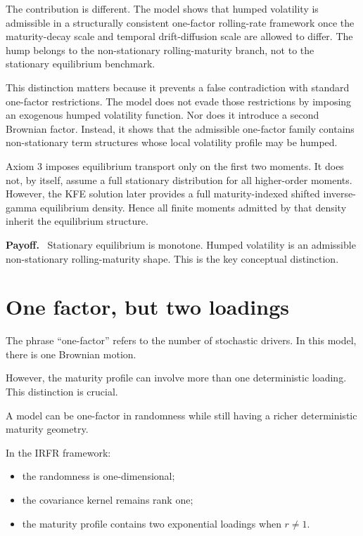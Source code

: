 \documentclass[11pt]{article}
\theoremstyle{plainbreak}
\newenvironment{takeaway}{%
    \vspace{0.4em}\noindent\textbf{Payoff.}\ }{\par\vspace{0.4em}}
\begin{document}
The contribution is different. The model shows that humped volatility is admissible in a structurally consistent one-factor rolling-rate framework once the maturity-decay scale and temporal drift-diffusion scale are allowed to differ. The hump belongs to the non-stationary rolling-maturity branch, not to the stationary equilibrium benchmark.

This distinction matters because it prevents a false contradiction with standard one-factor restrictions. The model does not evade those restrictions by imposing an exogenous humped volatility function. Nor does it introduce a second Brownian factor. Instead, it shows that the admissible one-factor family contains non-stationary term structures whose local volatility profile may be humped.

Axiom 3 imposes equilibrium transport only on the first two moments. It does not, by itself, assume a full stationary distribution for all higher-order moments. However, the KFE solution later provides a full maturity-indexed shifted inverse-gamma equilibrium density. Hence all finite moments admitted by that density inherit the equilibrium structure.

\begin{takeaway}
Stationary equilibrium is monotone. Humped volatility is an admissible non-stationary rolling-maturity shape. This is the key conceptual distinction.
\end{takeaway}

\section{One factor, but two loadings}

The phrase ``one-factor'' refers to the number of stochastic drivers. In this model, there is one Brownian motion.

However, the maturity profile can involve more than one deterministic loading. This distinction is crucial.

A model can be one-factor in randomness while still having a richer deterministic maturity geometry.

In the IRFR framework:
\begin{itemize}
    \item the randomness is one-dimensional;
    \item the covariance kernel remains rank one;
    \item the maturity profile contains two exponential loadings when \(r\neq 1\).
\end{itemize}
\end{document}
